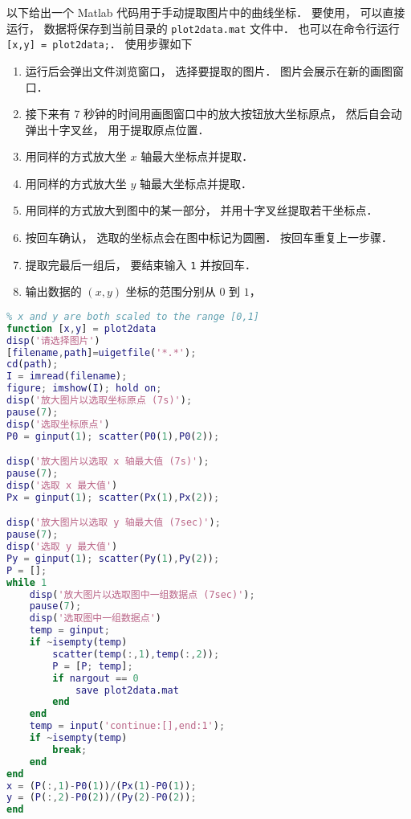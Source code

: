 

以下给出一个 Matlab 代码用于手动提取图片中的曲线坐标． 要使用， 可以直接运行， 数据将保存到当前目录的 \verb|plot2data.mat| 文件中． 也可以在命令行运行 \verb|[x,y] = plot2data;|． 使用步骤如下

\begin{enumerate}
\item 运行后会弹出文件浏览窗口， 选择要提取的图片． 图片会展示在新的画图窗口．
\item 接下来有 7 秒钟的时间用画图窗口中的放大按钮放大坐标原点， 然后自会动弹出十字叉丝， 用于提取原点位置．
\item 用同样的方式放大坐 $x$ 轴最大坐标点并提取．
\item 用同样的方式放大坐 $y$ 轴最大坐标点并提取．
\item 用同样的方式放大到图中的某一部分， 并用十字叉丝提取若干坐标点．
\item 按回车确认， 选取的坐标点会在图中标记为圆圈． 按回车重复上一步骤．
\item 提取完最后一组后， 要结束输入 \verb|1| 并按回车．
\item 输出数据的 $(x, y)$ 坐标的范围分别从 $0$ 到 $1$， 
\end{enumerate}


\begin{lstlisting}[language=matlab]
% Data Extractor for Plot
% x and y are both scaled to the range [0,1]
function [x,y] = plot2data
disp('请选择图片')
[filename,path]=uigetfile('*.*');
cd(path);
I = imread(filename);
figure; imshow(I); hold on;
disp('放大图片以选取坐标原点 (7s)');
pause(7);
disp('选取坐标原点')
P0 = ginput(1); scatter(P0(1),P0(2));

disp('放大图片以选取 x 轴最大值 (7s)');
pause(7);
disp('选取 x 最大值')
Px = ginput(1); scatter(Px(1),Px(2));

disp('放大图片以选取 y 轴最大值 (7sec)');
pause(7);
disp('选取 y 最大值')
Py = ginput(1); scatter(Py(1),Py(2));
P = [];
while 1
    disp('放大图片以选取图中一组数据点 (7sec)');
    pause(7);
    disp('选取图中一组数据点')
    temp = ginput;
    if ~isempty(temp)
        scatter(temp(:,1),temp(:,2));
        P = [P; temp];
        if nargout == 0
            save plot2data.mat
        end
    end
    temp = input('continue:[],end:1');
    if ~isempty(temp)
        break;
    end
end
x = (P(:,1)-P0(1))/(Px(1)-P0(1));
y = (P(:,2)-P0(2))/(Py(2)-P0(2));
end
\end{lstlisting}
